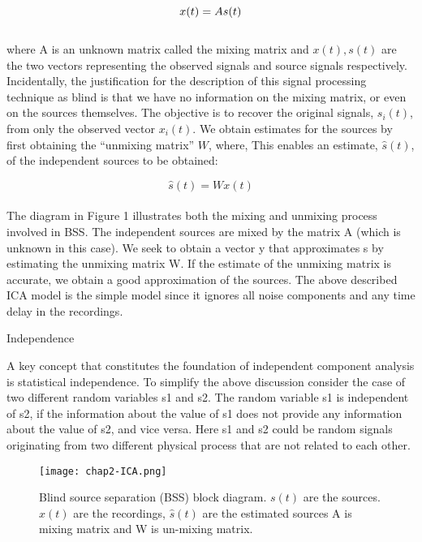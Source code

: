 \begin{compactitem}
\begin{equation}
\label{eq:ica-linear}
\\
x(t) = As(t)
\end{equation}\\

where A is an unknown matrix called the mixing matrix
and $x(t), s(t)$ are the two vectors representing the observed
signals and source signals respectively. Incidentally, the
justification for the description of this signal processing
technique as blind is that we have no information on the
mixing matrix, or even on the sources themselves.
The objective is to recover the original signals, $s_i(t)$,
from only the observed vector $x_i(t)$. We obtain estimates
for the sources by first obtaining the “unmixing matrix” $W$,
where,
This enables an estimate, $\hat{s}(t)$, of the independent
sources to be obtained:

\begin{equation}
\label{eq:ica-white}
\hat{s}(t) =Wx(t)
\end{equation}\\

The diagram in Figure 1 illustrates both the mixing
and unmixing process involved in BSS. The independent
sources are mixed by the matrix A (which is unknown in
this case). We seek to obtain a vector y that approximates
s by estimating the unmixing matrix W. If the estimate of
the unmixing matrix is accurate, we obtain a good approximation
of the sources.
The above described ICA model is the simple model
since it ignores all noise components and any time delay
in the recordings.
\item {Independence}

A key concept that constitutes the foundation of independent
component analysis is statistical independence. To
simplify the above discussion consider the case of two different
random variables s1 and s2. The random variable s1
is independent of s2, if the information about the value of
s1 does not provide any information about the value of s2,
and vice versa. Here s1 and s2 could be random signals
originating from two different physical process that are not
related to each other.

\begin{figure}[ht]
  \centering
    \texttt{[image: chap2-ICA.png]}
  \caption{Blind source separation (BSS) block diagram. $s(t)$ are the sources. $x(t)$ are the recordings,
	$\hat{s}(t)$ are the estimated sources A is mixing matrix and W is un-mixing matrix. }
  \label{fig:chap2-ICA}
\end{figure}


\end{compactitem}
